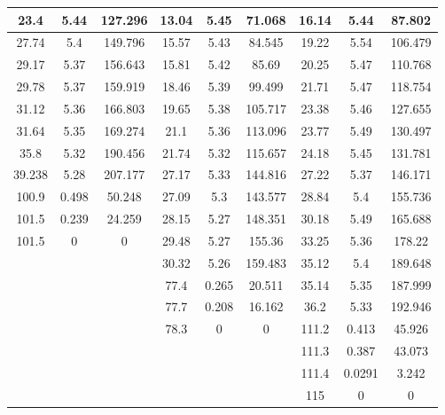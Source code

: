 \begin{table*}[]
\begin{tabular}{|c|c|c|c|c|c|c|c|c|}
23.4         & 5.44       & 127.296     & 13.04       & 5.45       & 71.068      & 16.14   & 5.44    & 87.802  \\ \hline
27.74        & 5.4        & 149.796     & 15.57       & 5.43       & 84.545      & 19.22   & 5.54    & 106.479 \\ \hline
29.17        & 5.37       & 156.643     & 15.81       & 5.42       & 85.69       & 20.25   & 5.47    & 110.768 \\ \hline
29.78        & 5.37       & 159.919     & 18.46       & 5.39       & 99.499      & 21.71   & 5.47    & 118.754 \\ \hline
31.12        & 5.36       & 166.803     & 19.65       & 5.38       & 105.717     & 23.38   & 5.46    & 127.655 \\ \hline
31.64        & 5.35       & 169.274     & 21.1        & 5.36       & 113.096     & 23.77   & 5.49    & 130.497 \\ \hline
35.8         & 5.32       & 190.456     & 21.74       & 5.32       & 115.657     & 24.18   & 5.45    & 131.781 \\ \hline
39.238       & 5.28       & 207.177     & 27.17       & 5.33       & 144.816     & 27.22   & 5.37    & 146.171 \\ \hline
100.9        & 0.498      & 50.248      & 27.09       & 5.3        & 143.577     & 28.84   & 5.4     & 155.736 \\ \hline
101.5        & 0.239      & 24.259      & 28.15       & 5.27       & 148.351     & 30.18   & 5.49    & 165.688 \\ \hline
101.5        & 0          & 0           & 29.48       & 5.27       & 155.36      & 33.25   & 5.36    & 178.22  \\ \hline
\multicolumn{3}{|c|}{\multirow{7}{*}{}} & 30.32       & 5.26       & 159.483     & 35.12   & 5.4     & 189.648 \\ \cline{4-9} 
\multicolumn{3}{|c|}{}                  & 77.4        & 0.265      & 20.511      & 35.14   & 5.35    & 187.999 \\ \cline{4-9} 
\multicolumn{3}{|c|}{}                  & 77.7        & 0.208      & 16.162      & 36.2    & 5.33    & 192.946 \\ \cline{4-9} 
\multicolumn{3}{|c|}{}                  & 78.3        & 0          & 0           & 111.2   & 0.413   & 45.926  \\ \cline{4-9} 
\multicolumn{3}{|c|}{}                  & \multicolumn{3}{c|}{\multirow{3}{*}{}} & 111.3   & 0.387   & 43.073  \\ \cline{7-9} 
\multicolumn{3}{|c|}{}                  & \multicolumn{3}{c|}{}                  & 111.4   & 0.0291  & 3.242   \\ \cline{7-9} 
\multicolumn{3}{|c|}{}                  & \multicolumn{3}{c|}{}                  & 115     & 0       & 0       \\ \hline
\end{tabular}
\end{table*}